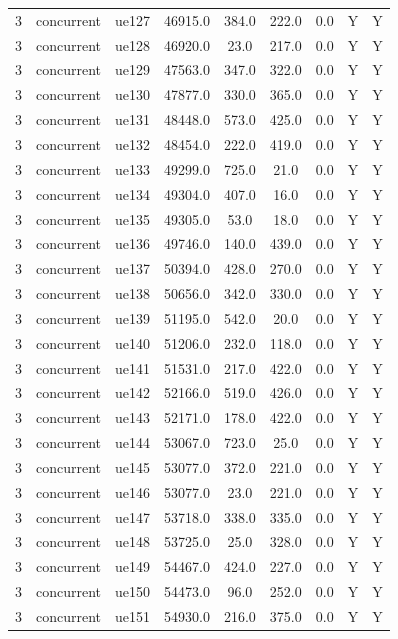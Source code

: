 \begin{table}[ht]
\begin{tabular}{|c|c|c|c|c|c|c|c|c|}
3 & concurrent & ue127 & 46915.0 & 384.0 & 222.0 & 0.0 & Y & Y \\
3 & concurrent & ue128 & 46920.0 & 23.0 & 217.0 & 0.0 & Y & Y \\
3 & concurrent & ue129 & 47563.0 & 347.0 & 322.0 & 0.0 & Y & Y \\
3 & concurrent & ue130 & 47877.0 & 330.0 & 365.0 & 0.0 & Y & Y \\
3 & concurrent & ue131 & 48448.0 & 573.0 & 425.0 & 0.0 & Y & Y \\
3 & concurrent & ue132 & 48454.0 & 222.0 & 419.0 & 0.0 & Y & Y \\
3 & concurrent & ue133 & 49299.0 & 725.0 & 21.0 & 0.0 & Y & Y \\
3 & concurrent & ue134 & 49304.0 & 407.0 & 16.0 & 0.0 & Y & Y \\
3 & concurrent & ue135 & 49305.0 & 53.0 & 18.0 & 0.0 & Y & Y \\
3 & concurrent & ue136 & 49746.0 & 140.0 & 439.0 & 0.0 & Y & Y \\
3 & concurrent & ue137 & 50394.0 & 428.0 & 270.0 & 0.0 & Y & Y \\
3 & concurrent & ue138 & 50656.0 & 342.0 & 330.0 & 0.0 & Y & Y \\
3 & concurrent & ue139 & 51195.0 & 542.0 & 20.0 & 0.0 & Y & Y \\
3 & concurrent & ue140 & 51206.0 & 232.0 & 118.0 & 0.0 & Y & Y \\
3 & concurrent & ue141 & 51531.0 & 217.0 & 422.0 & 0.0 & Y & Y \\
3 & concurrent & ue142 & 52166.0 & 519.0 & 426.0 & 0.0 & Y & Y \\
3 & concurrent & ue143 & 52171.0 & 178.0 & 422.0 & 0.0 & Y & Y \\
3 & concurrent & ue144 & 53067.0 & 723.0 & 25.0 & 0.0 & Y & Y \\
3 & concurrent & ue145 & 53077.0 & 372.0 & 221.0 & 0.0 & Y & Y \\
3 & concurrent & ue146 & 53077.0 & 23.0 & 221.0 & 0.0 & Y & Y \\
3 & concurrent & ue147 & 53718.0 & 338.0 & 335.0 & 0.0 & Y & Y \\
3 & concurrent & ue148 & 53725.0 & 25.0 & 328.0 & 0.0 & Y & Y \\
3 & concurrent & ue149 & 54467.0 & 424.0 & 227.0 & 0.0 & Y & Y \\
3 & concurrent & ue150 & 54473.0 & 96.0 & 252.0 & 0.0 & Y & Y \\
3 & concurrent & ue151 & 54930.0 & 216.0 & 375.0 & 0.0 & Y & Y \\

\end{tabular}
\end{table}

